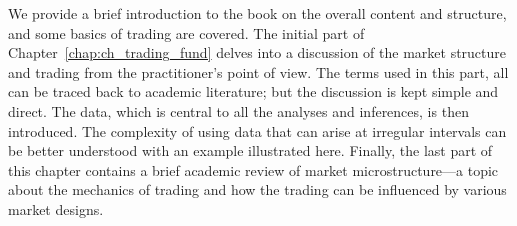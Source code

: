 
We provide a brief introduction to the book on the overall content and structure, and some basics of trading are covered. The initial part of Chapter~\ref{chap:ch_trading_fund} delves into a discussion of the market structure and trading from the practitioner's point of view. The terms used in this part, all can be traced back to academic literature; but the discussion is kept simple and direct. The data, which is central to all the analyses and inferences, is then introduced. The complexity of using data that can arise at irregular intervals can be better understood with an example illustrated here. Finally, the last part of this chapter contains a brief academic review of market microstructure---a topic about the mechanics of trading and how the trading can be influenced by various market designs.